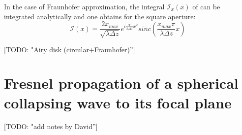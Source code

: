 \documentclass{iucr}              %
\newcommand{\todo}[1]{{\color{red}[TODO: "#1'']}}
\begin{document}
In the case of Fraunhofer approximation, the integral $\mathcal{I}_x(x)$ of \cite{goodmanfourier} can be integrated analytically and one obtains for the square aperture: 
\begin{equation}
\mathcal{I}(x) = \frac{2 x_{max}}{\sqrt{\lambda \Delta z}} e^{i \frac{\pi}{\lambda \Delta z} x^2 } sinc\left( \frac{x_{max}  \pi}{\lambda \Delta z} x \right) 
\end{equation}

\todo{Airy disk (circular+Fraunhofer)}

\section{Fresnel propagation of a spherical collapsing wave to its focal plane}
\label{appendix: collapsing}
\todo{add notes by David}








%

% 
% 
% 
% 
\end{document}
